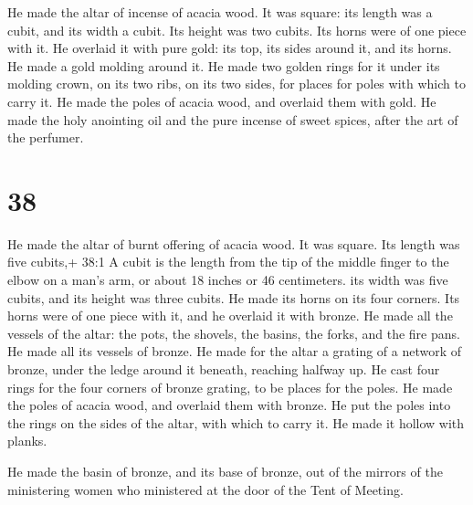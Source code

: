  He made the altar of incense of acacia wood. It was
square: its length was a cubit, and its width a cubit. Its height was
two cubits. Its horns were of one piece with it.  He
overlaid it with pure gold: its top, its sides around it, and its horns.
He made a gold molding around it.  He made two golden rings
for it under its molding crown, on its two ribs, on its two sides, for
places for poles with which to carry it.  He made the poles
of acacia wood, and overlaid them with gold.  He made the
holy anointing oil and the pure incense of sweet spices, after the art
of the perfumer.

\hypertarget{section-37}{%
\section{38}\label{section-37}}

 He made the altar of burnt offering of acacia wood. It was
square. Its length was five cubits,+ 38:1 A cubit is the length from the
tip of the middle finger to the elbow on a man's arm, or about 18 inches
or 46 centimeters. its width was five cubits, and its height was three
cubits.  He made its horns on its four corners. Its horns
were of one piece with it, and he overlaid it with bronze. 
He made all the vessels of the altar: the pots, the shovels, the basins,
the forks, and the fire pans. He made all its vessels of bronze.
 He made for the altar a grating of a network of bronze,
under the ledge around it beneath, reaching halfway up.  He
cast four rings for the four corners of bronze grating, to be places for
the poles.  He made the poles of acacia wood, and overlaid
them with bronze.  He put the poles into the rings on the
sides of the altar, with which to carry it. He made it hollow with
planks.

 He made the basin of bronze, and its base of bronze, out of
the mirrors of the ministering women who ministered at the door of the
Tent of Meeting.

